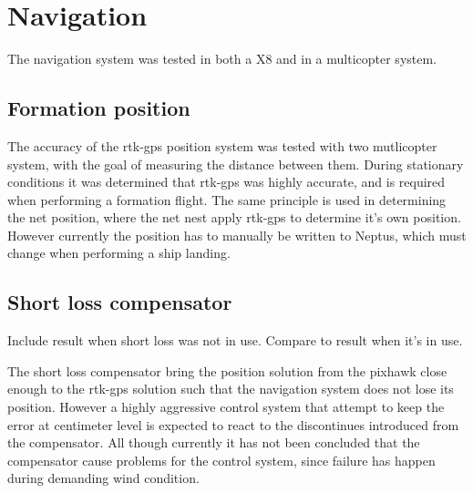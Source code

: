 \section{Navigation}
The navigation system was tested in both a X8 and in a multicopter system.

\subsection{Formation position}
The accuracy of the \gls{rtk-gps} position system was tested with two mutlicopter system, with the goal of measuring the distance between them. During stationary conditions it was determined that \gls{rtk-gps} was highly accurate, and is required when performing a formation flight. The same principle is used in determining the net position, where the net nest apply \gls{rtk-gps} to determine it's own position. However currently the position has to manually be written to Neptus, which must change when performing a ship landing.
\subsection{Short loss compensator}
Include result when short loss was not in use. Compare to result when it's in use.

The short loss compensator bring the position solution from the pixhawk close enough to the \gls{rtk-gps} solution such that the navigation system does not lose its position. However a highly aggressive control system that attempt to keep the error at centimeter level is expected to react to the discontinues introduced from the compensator. All though currently it has not been concluded that the compensator cause problems for the control system, since failure has happen during demanding wind condition. 